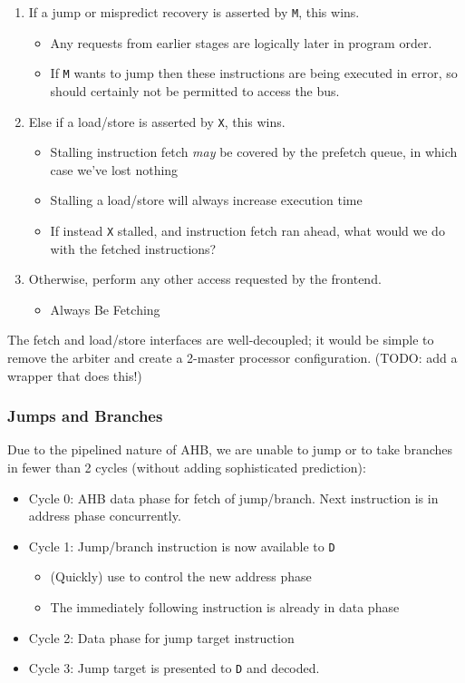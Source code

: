 \begin{enumerate}
	\item If a jump or mispredict recovery is asserted by {\tt M}, this wins.
	\begin{itemize}
		\item Any requests from earlier stages are logically later in program order.
		\item If {\tt M} wants to jump then these instructions are being executed in error, so should certainly not be permitted to access the bus.
	\end{itemize}
	\item Else if a load/store is asserted by {\tt X}, this wins.
	\begin{itemize}
		\item Stalling instruction fetch {\it may} be covered by the prefetch queue, in which case we've lost nothing
		\item Stalling a load/store will always increase execution time
		\item If instead {\tt X} stalled, and instruction fetch ran ahead, what would we do with the fetched instructions?
	\end{itemize}
	\item Otherwise, perform any other access requested by the frontend.
	\begin{itemize}
		\item Always Be Fetching
	\end{itemize}
\end{enumerate}

The fetch and load/store interfaces are well-decoupled; it would be simple to remove the arbiter and create a 2-master processor configuration. (TODO: add a wrapper that does this!)

\subsubsection{Jumps and Branches}

Due to the pipelined nature of AHB, we are unable to jump or to take branches in fewer than 2 cycles (without adding sophisticated prediction):

\begin{itemize}
\item Cycle 0: AHB data phase for fetch of jump/branch. Next instruction is in address phase concurrently.
\item Cycle 1: Jump/branch instruction is now available to {\tt D}
	\begin{itemize}
		\item (Quickly) use to control the new address phase
		\item The immediately following instruction is already in data phase
	\end{itemize}
\item Cycle 2: Data phase for jump target instruction
\item Cycle 3: Jump target is presented to {\tt D} and decoded.
\end{itemize}


